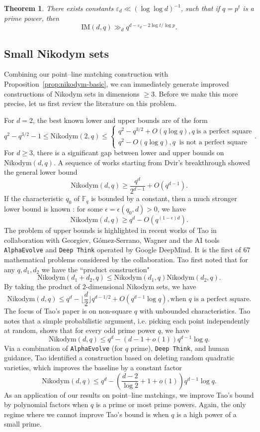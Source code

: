 \documentclass[12pt,reqno]{amsart}
\theoremstyle{plain}
\newtheorem{theorem}{Theorem}[section]
\theoremstyle{definition}
\newcommand{\F}{\mathbb{F}}
\newcommand{\IM}{\mathrm{IM}}
\newcommand{\Nik}{\mathrm{Nikodym}}
\newcommand{\1}{\mathbf{1}}
\begin{document}
\begin{theorem}
    \label{thm:prime-power-high-dim}
    There exists constants $\varepsilon_d \ll (\log \log d)^{-1}$, such that if $q = p^t$ is a prime power, then
    $$\IM(d, q) \gg_d q^{d - \varepsilon_d - 2 \log t / \log p}.$$
\end{theorem}
\subsection{Small Nikodym sets}
Combining our point--line matching construction with Proposition~\ref{prop:nikodym-basic}, we can immediately generate improved constructions of Nikodym sets in dimensions $\geq 3$. Before we make this more precise, let us first review the literature on this problem. 

For $d = 2$, the best known lower and upper bounds are of the form
$$q^2 - q^{3/2} - 1 \leq \Nik(2, q) \leq \begin{cases}
    q^2 - q^{3/2} + O(q \log q), \text{$q\ $is a perfect square} \\
    q^2 - O(q \log q), \text{$q\ $ is not a perfect square}
\end{cases}.$$
For $d \geq 3$, there is a significant gap between lower and upper bounds on $\Nik(d, q)$. A sequence of works starting from Dvir's breakthrough \cite{BukhChao2021, Dvir2009Kakeya,LundSarafWolf2018} showed the general lower bound
$$\Nik(d, q) \geq \frac{q^d}{2^{d - 1}} + O(q^{d - 1}).$$
If the characteristic $q_0$ of $\F_q$ is bounded by a constant, then a much stronger lower bound is known \cite{guo2013affine}: for some $\epsilon = \epsilon(q_0, d) > 0$, we have
$$\Nik(d, q) \geq q^d - O(q^{(1 - \epsilon) d}).$$
The problem of upper bounds is highlighted in recent works \cite{Deepmind2025, Tao2025} of Tao in collaboration with Georgiev, G\'{o}mez-Serrano, Wagner and the AI tools \texttt{AlphaEvolve} and \texttt{Deep Think} operated by Google DeepMind. It is the first of 67 mathematical problems considered by the collaboration. Tao \cite{Tao2025} first noted that for any $q, d_1, d_2$ we have the ``product construction"
$$\Nik(d_1 + d_2, q) \leq \Nik(d_1, q) \Nik(d_2, q).$$
By taking the product of $2$-dimensional Nikodym sets, we have
$$\Nik(d, q) \leq
    q^d - \lfloor \frac{d}{2} \rfloor q^{d - 1/2} + O(q^{d - 1} \log q), \text{when $q$ is a perfect square}.$$
The focus of Tao's paper is on non-square $q$ with unbounded characteristics. Tao notes that a simple probabilistic argument, i.e. picking each point independently at random, shows that for every odd prime power $q$, we have
$$\Nik(d, q) \leq q^d - (d - 1 + o(1))q^{d - 1} \log q.$$
Via a combination of \texttt{AlphaEvolve} (for $q$ prime), \texttt{Deep Think}, and human guidance, Tao identified a construction based on deleting random quadratic varieties, which improves the baseline by a constant factor
$$\Nik(d, q) \leq q^d - \left(\frac{d - 2}{\log 2} + 1 +  o(1)\right)q^{d - 1} \log q.$$
As an application of our results on point--line matchings, we improve Tao's bound by polynomial factors when $q$ is a prime or most prime powers. Again, the only regime where we cannot improve Tao's bound is when $q$ is a high power of a small prime. 
\end{document}
